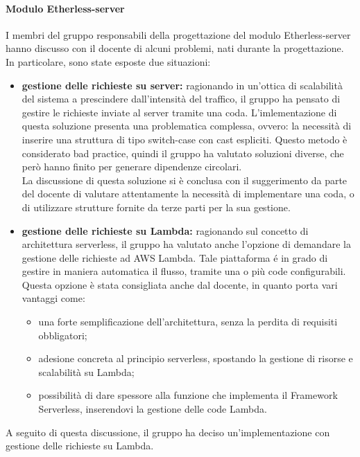 	\paragraph{Modulo Etherless-server}
		I membri del gruppo responsabili della progettazione del modulo Etherless-server hanno discusso con il docente di alcuni problemi, nati durante la progettazione. In particolare, sono state esposte due situazioni:
		\begin{itemize}
			\item \textbf{gestione delle richieste su server:} ragionando in un’ottica di scalabilità del sistema a prescindere dall’intensità del traffico, il gruppo ha pensato di gestire le richieste inviate al server tramite una coda. L’imlementazione di questa soluzione presenta una problematica complessa, ovvero: la necessità di inserire una struttura di tipo switch-case con cast espliciti. Questo metodo è considerato bad practice, quindi il gruppo ha valutato soluzioni diverse, che però hanno finito per generare dipendenze circolari.\\La discussione di questa soluzione si è conclusa con il suggerimento da parte del docente di valutare attentamente la necessità di implementare una coda, o di utilizzare strutture fornite da terze parti per la sua gestione.
			\item \textbf{gestione delle richieste su Lambda:} ragionando sul concetto di architettura serverless, il gruppo ha valutato anche l’opzione di demandare la gestione delle richieste ad AWS Lambda. Tale piattaforma é in grado di gestire in maniera automatica il flusso, tramite una o più code configurabili. Questa opzione è stata consigliata anche dal docente, in quanto porta vari vantaggi come:
			\begin{itemize}
				\item una forte semplificazione dell’architettura, senza la perdita di requisiti obbligatori;
				\item adesione concreta al principio serverless, spostando la gestione di risorse e scalabilità su Lambda;
				\item possibilità di dare spessore alla funzione che implementa il Framework Serverless, inserendovi la gestione delle code Lambda.
			\end{itemize}
		\end{itemize}
		A seguito di questa discussione, il gruppo ha deciso un’implementazione con gestione delle richieste su Lambda.
